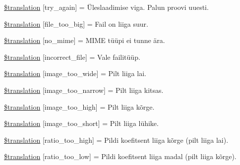 \begin{DoxyCompactItemize}
\item 
\hyperlink{class_8upload_8et___e_e_8php_a3afc377bd803683314f413a814243066}{\$translation} \mbox{[}\textquotesingle{}try\+\_\+again\textquotesingle{}\mbox{]} = \textquotesingle{}Üleslaadimise viga. Palun proovi uuesti.\textquotesingle{}
\item 
\hyperlink{class_8upload_8et___e_e_8php_a476278eb4a0c3df56af068e2d511a741}{\$translation} \mbox{[}\textquotesingle{}file\+\_\+too\+\_\+big\textquotesingle{}\mbox{]} = \textquotesingle{}Fail on liiga suur.\textquotesingle{}
\item 
\hyperlink{class_8upload_8et___e_e_8php_a191a55df8e3bb7f3c51b70f3c1932e02}{\$translation} \mbox{[}\textquotesingle{}no\+\_\+mime\textquotesingle{}\mbox{]} = \textquotesingle{}M\+I\+M\+E tüüpi ei tunne ära.\textquotesingle{}
\item 
\hyperlink{class_8upload_8et___e_e_8php_a4d32343e2699edd6fd435f9c832cb9c7}{\$translation} \mbox{[}\textquotesingle{}incorrect\+\_\+file\textquotesingle{}\mbox{]} = \textquotesingle{}Vale failitüüp.\textquotesingle{}
\item 
\hyperlink{class_8upload_8et___e_e_8php_a0dd3e4930ca1f59ae280f4b1006525cd}{\$translation} \mbox{[}\textquotesingle{}image\+\_\+too\+\_\+wide\textquotesingle{}\mbox{]} = \textquotesingle{}Pilt liiga lai.\textquotesingle{}
\item 
\hyperlink{class_8upload_8et___e_e_8php_a5c9a4cd67fd21c32e0a3b434591a6037}{\$translation} \mbox{[}\textquotesingle{}image\+\_\+too\+\_\+narrow\textquotesingle{}\mbox{]} = \textquotesingle{}Pilt liiga kitsas.\textquotesingle{}
\item 
\hyperlink{class_8upload_8et___e_e_8php_aa27bde361343f3b63c7cd441860024f8}{\$translation} \mbox{[}\textquotesingle{}image\+\_\+too\+\_\+high\textquotesingle{}\mbox{]} = \textquotesingle{}Pilt liiga kõrge.\textquotesingle{}
\item 
\hyperlink{class_8upload_8et___e_e_8php_a86fcd4e1157b00032df451188d735527}{\$translation} \mbox{[}\textquotesingle{}image\+\_\+too\+\_\+short\textquotesingle{}\mbox{]} = \textquotesingle{}Pilt liiga lühike.\textquotesingle{}
\item 
\hyperlink{class_8upload_8et___e_e_8php_a23396f6ce7f31e5e5f1b57580621d982}{\$translation} \mbox{[}\textquotesingle{}ratio\+\_\+too\+\_\+high\textquotesingle{}\mbox{]} = \textquotesingle{}Pildi koefitsent liiga kõrge (pilt liiga lai).\textquotesingle{}
\item 
\hyperlink{class_8upload_8et___e_e_8php_ac533b9a479f056b0b8623e4268f068c2}{\$translation} \mbox{[}\textquotesingle{}ratio\+\_\+too\+\_\+low\textquotesingle{}\mbox{]} = \textquotesingle{}Pildi koefitsent liiga madal (pilt liiga kõrge).\textquotesingle{}

\end{DoxyCompactItemize}
